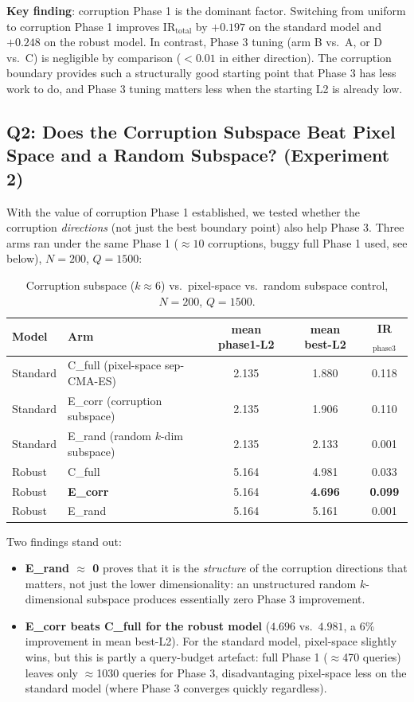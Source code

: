 \documentclass[11pt, a4paper]{article}
\begin{document}
\textbf{Key finding}: corruption Phase 1 is the dominant factor. Switching from uniform to corruption Phase 1 improves IR$_\text{total}$ by $+0.197$ on the standard model and $+0.248$ on the robust model. In contrast, Phase 3 tuning (arm B vs.\ A, or D vs.\ C) is negligible by comparison ($<0.01$ in either direction). The corruption boundary provides such a structurally good starting point that Phase 3 has less work to do, and Phase 3 tuning matters less when the starting L2 is already low.

\subsection{Q2: Does the Corruption Subspace Beat Pixel Space and a Random Subspace? (Experiment 2)}

With the value of corruption Phase 1 established, we tested whether the corruption \emph{directions} (not just the best boundary point) also help Phase 3. Three arms ran under the same Phase 1 ($\approx10$ corruptions, buggy full Phase 1 used, see below), $N=200$, $Q=1500$:

\begin{table}[htbp]
\centering
\caption{Corruption subspace ($k\approx6$) vs.\ pixel-space vs.\ random subspace control, $N=200$, $Q=1500$.}
\label{tab:exp_subspace1}
\begin{tabular}{llccc}
\toprule
Model & Arm & mean phase1-L2 & mean best-L2 & IR$_\text{phase3}$ \\
\midrule
Standard & C\_full (pixel-space sep-CMA-ES) & 2.135 & 1.880 & 0.118 \\
Standard & E\_corr (corruption subspace)    & 2.135 & 1.906 & 0.110 \\
Standard & E\_rand (random $k$-dim subspace) & 2.135 & 2.133 & 0.001 \\
\midrule
Robust   & C\_full & 5.164 & 4.981 & 0.033 \\
Robust   & \textbf{E\_corr} & 5.164 & \textbf{4.696} & \textbf{0.099} \\
Robust   & E\_rand & 5.164 & 5.161 & 0.001 \\
\bottomrule
\end{tabular}
\end{table}

Two findings stand out:
\begin{itemize}[noitemsep]
  \item \textbf{E\_rand $\approx$ 0} proves that it is the \emph{structure} of the corruption directions that matters, not just the lower dimensionality: an unstructured random $k$-dimensional subspace produces essentially zero Phase 3 improvement.
  \item \textbf{E\_corr beats C\_full for the robust model} ($4.696$ vs.\ $4.981$, a $6\%$ improvement in mean best-L2). For the standard model, pixel-space slightly wins, but this is partly a query-budget artefact: full Phase 1 ($\approx$470 queries) leaves only $\approx$1030 queries for Phase 3, disadvantaging pixel-space less on the standard model (where Phase 3 converges quickly regardless).
\end{itemize}
\end{document}
